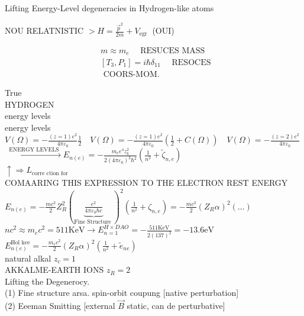 \documentclass[10pt]{article}
\begin{document}
\captionsetup{singlelinecheck=false}
Lifting Energy-Level degeneracies in Hydrogen-like atoms

NOU RELATNISTIC $>H=\frac{\vec{p}^{2}}{2 m}+V_{\text {egr }}$ (OUI)

$$
\begin{aligned}
& m \approx m_{e} \quad \text { RESUCES MASS } \\
& {\left[T_{3}, P_{1}\right]=i \hbar \delta_{11} \quad \text { RESOCES }} \\
& \text { COORS-MOM. }
\end{aligned}
$$

True\\
HYDROGEN\\
energy levels\\
energy levels\\
$V(\Omega)=-\frac{(z=1) e^{2}}{4 \pi \varepsilon_{0}} \frac{1}{2} \quad V(\Omega)=-\frac{(z=1) e^{2}}{4 \pi \varepsilon_{0}}\left(\frac{1}{2}+C(\Omega)\right) \quad V(\Omega)=-\frac{(z=2) e^{2}}{4 \pi \varepsilon_{0}}$\\
$\xrightarrow{\text { ENERGY LEVELS }} E_{n(e)}=-\frac{m_{e} e^{4} z_{k}^{2}}{2\left(4 \pi \varepsilon_{0}\right)^{2} \hbar^{2}}\left(\frac{1}{n^{2}}+\widetilde{\zeta}_{n, e}\right)$\\
$\uparrow \Rightarrow L_{\text {corre ction for }}$\\
COMAARING THIS EXPRESSION TO THE ELECTRON REST ENERGY\\
$E_{n(e)}=-\frac{m c^{2}}{2} Z_{R}^{2}(\underbrace{\frac{e^{2}}{4 \pi \varepsilon_{0} \hbar c}}_{\text {Fine Structure }})^{2}\left(\frac{1}{n^{2}}+\zeta_{n, e}\right)=-\frac{m c^{2}}{2}\left(Z_{R} \alpha\right)^{2}(\ldots)$\\
$n c^{2} \approx m_{e} c^{2}=511 \mathrm{KeV} \rightarrow E_{n=1}^{H \times D A O}=-\frac{511 \mathrm{KeV}}{2(137)^{2}}=-13.6 \mathrm{eV}$\\
$E_{n(e)}^{\text {Hol } \mathrm{k} \mathrm{e} \mathrm{e}}=-\frac{m_{e} c^{2}}{2}\left(Z_{R} \alpha\right)^{2}\left(\frac{1}{n^{2}}+\tilde{e}_{n e}\right)$\\
natural alkal $z_{c}=1$\\
AKKALME-EARTH IONS $z_{R}=2$\\
Lifting the Degenerocy.\\[0pt]
(1) Fine structure arsa. spin-orbit coupung [native perturbation]\\
(2) Eeeman Smitting [external $\vec{B}$ static, can de perturbative]
\end{document}
